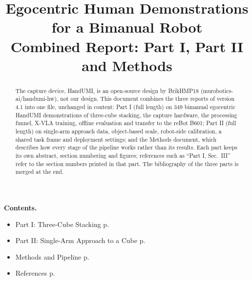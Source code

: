 \documentclass[conference,10pt]{IEEEtran}
\begin{document}
\title{Egocentric Human Demonstrations for a Bimanual Robot\\[1mm]\Large Combined Report: Part I, Part II and Methods}
\author{
}
\maketitle
\begin{abstract}
The capture device, HandUMI, is an open-source design by BrikHMP18 (murobotics-ai/handumi-hw), not our design.
This document combines the three reports of version 4.1 into one file, unchanged in content: Part I (full length) on 349
bimanual egocentric HandUMI demonstrations of three-cube stacking, the capture hardware, the processing funnel, X-VLA
training, offline evaluation and transfer to the reBot B601; Part II (full length) on single-arm approach data, object-based
scale, robot-side calibration, a shared task frame and deployment settings; and the Methods document, which describes how
every stage of the pipeline works rather than its results. Each part keeps its own abstract, section numbering and
figures; references such as ``Part I, Sec.~III'' refer to the section numbers printed in that part. The bibliography of the
three parts is merged at the end.
\end{abstract}

\noindent\textbf{Contents.}
\begin{itemize}
\item Part I: Three-Cube Stacking \dotfill p.~\pageref{part:p1}
\item Part II: Single-Arm Approach to a Cube \dotfill p.~\pageref{part:p2}
\item Methods and Pipeline \dotfill p.~\pageref{part:m}
\item References \dotfill p.~\pageref{part:refs}
\end{itemize}
\end{document}
